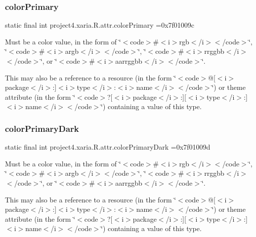 \subsubsection{\texorpdfstring{color\+Primary}{colorPrimary}}
{\footnotesize\ttfamily static final int project4.\+xaria.\+R.\+attr.\+color\+Primary =0x7f01009c\hspace{0.3cm}{\ttfamily [static]}}

Must be a color value, in the form of \char`\"{}$<$code$>$\#$<$i$>$rgb$<$/i$>$$<$/code$>$\char`\"{}, \char`\"{}$<$code$>$\#$<$i$>$argb$<$/i$>$$<$/code$>$\char`\"{}, \char`\"{}$<$code$>$\#$<$i$>$rrggbb$<$/i$>$$<$/code$>$\char`\"{}, or \char`\"{}$<$code$>$\#$<$i$>$aarrggbb$<$/i$>$$<$/code$>$\char`\"{}. 

This may also be a reference to a resource (in the form \char`\"{}$<$code$>$@\mbox{[}$<$i$>$package$<$/i$>$\+:\mbox{]}$<$i$>$type$<$/i$>$\+:$<$i$>$name$<$/i$>$$<$/code$>$\char`\"{}) or theme attribute (in the form \char`\"{}$<$code$>$?\mbox{[}$<$i$>$package$<$/i$>$\+:\mbox{]}\mbox{[}$<$i$>$type$<$/i$>$\+:\mbox{]}$<$i$>$name$<$/i$>$$<$/code$>$\char`\"{}) containing a value of this type. \mbox{\label{classproject4_1_1xaria_1_1R_1_1attr_a54666467034380ce73718a30174be4f9}} 
\subsubsection{\texorpdfstring{color\+Primary\+Dark}{colorPrimaryDark}}
{\footnotesize\ttfamily static final int project4.\+xaria.\+R.\+attr.\+color\+Primary\+Dark =0x7f01009d\hspace{0.3cm}{\ttfamily [static]}}

Must be a color value, in the form of \char`\"{}$<$code$>$\#$<$i$>$rgb$<$/i$>$$<$/code$>$\char`\"{}, \char`\"{}$<$code$>$\#$<$i$>$argb$<$/i$>$$<$/code$>$\char`\"{}, \char`\"{}$<$code$>$\#$<$i$>$rrggbb$<$/i$>$$<$/code$>$\char`\"{}, or \char`\"{}$<$code$>$\#$<$i$>$aarrggbb$<$/i$>$$<$/code$>$\char`\"{}. 

This may also be a reference to a resource (in the form \char`\"{}$<$code$>$@\mbox{[}$<$i$>$package$<$/i$>$\+:\mbox{]}$<$i$>$type$<$/i$>$\+:$<$i$>$name$<$/i$>$$<$/code$>$\char`\"{}) or theme attribute (in the form \char`\"{}$<$code$>$?\mbox{[}$<$i$>$package$<$/i$>$\+:\mbox{]}\mbox{[}$<$i$>$type$<$/i$>$\+:\mbox{]}$<$i$>$name$<$/i$>$$<$/code$>$\char`\"{}) containing a value of this type. \mbox{\label{classproject4_1_1xaria_1_1R_1_1attr_a3f9187a777fa322353b2a349ee38ebb5}} 
